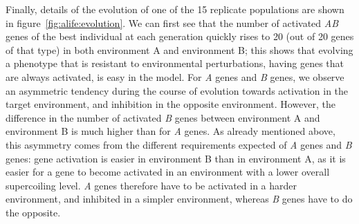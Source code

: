 Finally, details of the evolution of one of the 15 replicate populations are shown in figure~\ref{fig:alife:evolution}.
We can first see that the number of activated \emph{AB} genes of the best individual at each generation quickly rises to 20 (out of 20 genes of that type) in both environment A and environment B; this shows that evolving a phenotype that is resistant to environmental perturbations, having genes that are always activated, is easy in the model.
For \emph{A} genes and \emph{B} genes, we observe an asymmetric tendency during the course of evolution towards activation in the target environment, and inhibition in the opposite environment.
However, the difference in the number of activated \emph{B} genes between environment A and environment B is much higher than for \emph{A} genes.
As already mentioned above, this asymmetry comes from the different requirements expected of \emph{A} genes and \emph{B} genes: gene activation is easier in environment B than in environment A, as it is easier for a gene to become activated in an environment with a lower overall supercoiling level.
\emph{A} genes therefore have to be activated in a harder environment, and inhibited in a simpler environment, whereas \emph{B} genes have to do the opposite.

